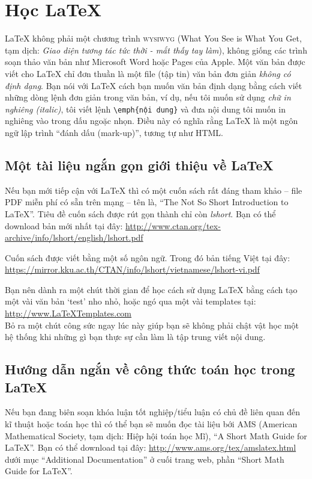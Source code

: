 \section{Học \LaTeX{}}

\LaTeX{} không phải một chương trình \textsc{wysiwyg} (What You See is What You Get, tạm dịch: \textit{Giao diện tương tác tức thời - mắt thấy tay làm}), không giống các trình soạn thảo văn bản như Microsoft Word hoặc Pages của Apple. Một văn bản được viết cho \LaTeX{} chỉ đơn thuần là một file (tập tin) văn bản đơn giản \emph{không có định dạng}. Bạn nói với \LaTeX{} cách bạn muốn văn bản định dạng bằng cách viết những dòng lệnh đơn giản trong văn bản, ví dụ, nếu tôi muốn sử dụng \emph{chữ in nghiêng (italic)}, tôi viết lệnh \verb|\emph{nội dung}| và đưa nội dung tôi muốn in nghiêng vào trong dấu ngoặc nhọn. Điều này có nghĩa rằng \LaTeX{} là một ngôn ngữ lập trình \enquote{đánh dấu (mark-up)}, tương tự như HTML.


\subsection{Một tài liệu ngắn gọn giới thiệu về \LaTeX{}}

Nếu bạn mới tiếp cận với \LaTeX{} thì có một cuốn sách rất đáng tham khảo -- file PDF miễn phí có sẵn trên mạng -- tên là, \enquote{The Not So Short Introduction to \LaTeX{}}. Tiêu đề cuốn sách được rút gọn thành chỉ còn \emph{lshort}. Bạn có thể download bản mới nhất tại đây:
\url{http://www.ctan.org/tex-archive/info/lshort/english/lshort.pdf}

Cuốn sách được viết bằng một số ngôn ngữ. Trong đó bản tiếng Việt tại đây:
\url{https://mirror.kku.ac.th/CTAN/info/lshort/vietnamese/lshort-vi.pdf}

Bạn nên dành ra một chút thời gian để học cách sử dụng \LaTeX{} bằng cách tạo một vài văn bản `test' nho nhỏ, hoặc ngó qua một vài templates tại:\\
\url{http://www.LaTeXTemplates.com}\\
Bỏ ra một chút công sức ngay lúc này giúp bạn sẽ không phải chật vật học một hệ thống khi những gì bạn thực sự cần làm là tập trung viết nội dung.


\subsection{Hướng dẫn ngắn về công thức toán học trong \LaTeX{}}

Nếu bạn đang biên soạn khóa luận tốt nghiệp/tiểu luận có chủ đề liên quan đến kĩ thuật hoặc toán học thì có thể bạn sẽ muốn đọc tài liệu bới AMS (American Mathematical Society, tạm dịch: Hiệp hội toán học Mĩ), \enquote{A Short Math Guide for \LaTeX{}}. Bạn có thể download tại đây:
\url{http://www.ams.org/tex/amslatex.html}
dưới mục \enquote{Additional Documentation} ở cuối trang web, phần \enquote{Short Math Guide for \LaTeX{}}.


